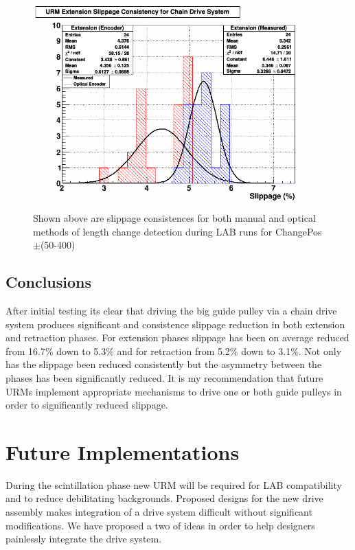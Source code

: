 \documentclass[paper=a4, fontsize=11pt]{scrartcl}
\numberwithin{equation}{section}		%
\numberwithin{figure}{section}			%
\numberwithin{table}{section}				%
\begin{document}
        \begin{figure}[H]
                \includegraphics[height=8cm]{fdat4}
                \caption{Shown above are slippage consistences for both manual and optical methods of length change detection during LAB runs for ChangePos$\pm$(50-400)}
                \label{op2}
        \end{figure}
        


\subsection{Conclusions}
After initial testing its clear that driving the big guide pulley via a chain drive system produces significant and consistence slippage reduction in both extension and retraction phases. For extension phases slippage has been on average reduced from 16.7\% down to 5.3\% and for retraction from 5.2\% down to 3.1\%. Not only has the slippage been reduced consistently but the asymmetry between the phases has been significantly reduced. It is my recommendation that future URMs implement appropriate mechanisms to drive one or both guide pulleys in order to significantly reduced slippage. 
\newpage
\section{Future Implementations}
During the scintillation phase new URM will be required for LAB compatibility and to reduce debilitating backgrounds. Proposed designs for the new drive assembly makes integration of a drive system difficult without significant modifications. We have proposed a two of ideas in order to help designers painlessly integrate the drive system.
\end{document}
